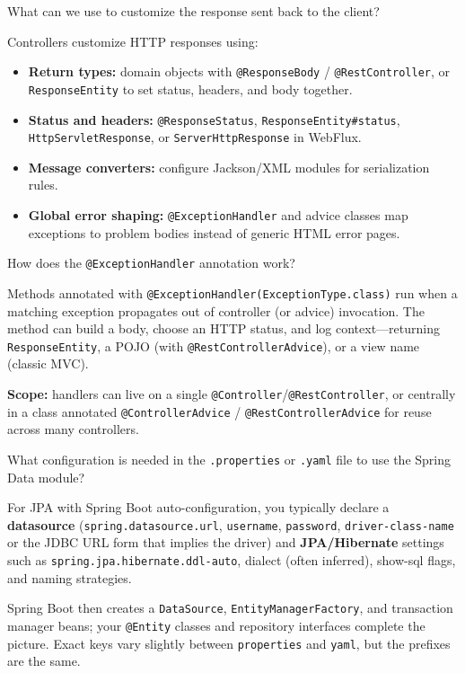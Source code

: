 \question[4]
What can we use to customize the response sent back to the client?
\begin{solutionorbox}[1.25in]
  Controllers customize HTTP responses using:
  \begin{itemize}
    \item \textbf{Return types:} domain objects with \texttt{@ResponseBody} / \texttt{@RestController}, or \texttt{ResponseEntity} to set status, headers, and body together.
    \item \textbf{Status and headers:} \texttt{@ResponseStatus}, \texttt{ResponseEntity\#status}, \texttt{HttpServletResponse}, or \texttt{ServerHttpResponse} in WebFlux.
    \item \textbf{Message converters:} configure Jackson/XML modules for serialization rules.
    \item \textbf{Global error shaping:} \texttt{@ExceptionHandler} and advice classes map exceptions to problem bodies instead of generic HTML error pages.
  \end{itemize}
\end{solutionorbox}

\question[4]
How does the \texttt{@ExceptionHandler} annotation work?
\begin{solutionorbox}[1.3in]
  Methods annotated with \texttt{@ExceptionHandler(ExceptionType.class)} run when a matching exception propagates out of controller (or advice) invocation. The method can build a body, choose an HTTP status, and log context---returning \texttt{ResponseEntity}, a POJO (with \texttt{@RestControllerAdvice}), or a view name (classic MVC).

  \noindent\textbf{Scope:} handlers can live on a single \texttt{@Controller}/\texttt{@RestController}, or centrally in a class annotated \texttt{@ControllerAdvice} / \texttt{@RestControllerAdvice} for reuse across many controllers.
\end{solutionorbox}

\newpage


\question[4]
What configuration is needed in the \texttt{.properties} or \texttt{.yaml} file to use the Spring Data module?
\begin{solutionorbox}[1.35in]
  For JPA with Spring Boot auto-configuration, you typically declare a \textbf{datasource} (\texttt{spring.datasource.url}, \texttt{username}, \texttt{password}, \texttt{driver-class-name} or the JDBC URL form that implies the driver) and \textbf{JPA/Hibernate} settings such as \texttt{spring.jpa.hibernate.ddl-auto}, dialect (often inferred), show-sql flags, and naming strategies.

  Spring Boot then creates a \texttt{DataSource}, \texttt{EntityManagerFactory}, and transaction manager beans; your \texttt{@Entity} classes and repository interfaces complete the picture. Exact keys vary slightly between \texttt{properties} and \texttt{yaml}, but the prefixes are the same.
\end{solutionorbox}

